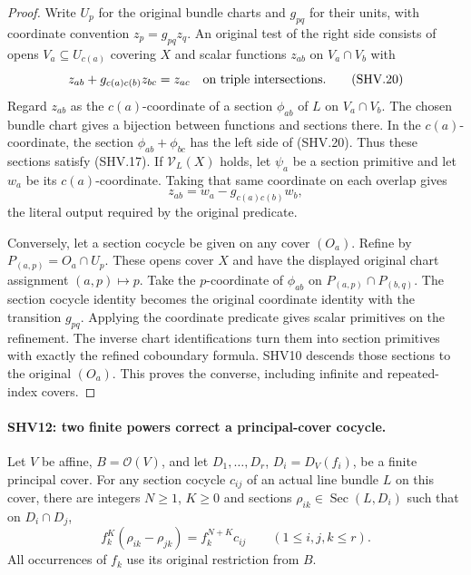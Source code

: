 \documentclass[11pt,a4paper]{article}
\numberwithin{equation}{section}
\theoremstyle{remark}\newtheorem{remark}[theorem]{Remark}
\begin{document}
\begin{proof}
Write $U_p$ for the original bundle charts and $g_{pq}$ for
their units, with coordinate convention $z_p=g_{pq}z_q$.
An original test of the right side consists of opens
$V_a\subseteq U_{c(a)}$ covering $X$ and scalar functions
$z_{ab}$ on $V_a\cap V_b$ with
\[
 z_{ab}+g_{c(a)c(b)}z_{bc}=z_{ac}
                    \quad\hbox{on triple intersections}.
                                                        \tag{SHV.20}
\]
Regard $z_{ab}$ as the $c(a)$-coordinate of a section
$\phi_{ab}$ of $L$ on $V_a\cap V_b$.  The chosen bundle
chart gives a bijection between functions and sections there.
In the $c(a)$-coordinate, the section
$\phi_{ab}+\phi_{bc}$ has the left side of (SHV.20).
Thus these sections satisfy (SHV.17).
If $\mathcal V_L(X)$ holds, let $\psi_a$ be a section primitive
and let $w_a$ be its $c(a)$-coordinate.  Taking that same
coordinate on each overlap gives
\[
             z_{ab}=w_a-g_{c(a)c(b)}w_b,
                                                        \tag{SHV.21}
\]
the literal output required by the original predicate.

Conversely, let a section cocycle be given on any cover $(O_a)$.
Refine by $P_{(a,p)}=O_a\cap U_p$.  These opens cover $X$
and have the displayed original chart assignment $(a,p)\mapsto p$.
Take the $p$-coordinate of $\phi_{ab}$ on
$P_{(a,p)}\cap P_{(b,q)}$.  The section cocycle identity becomes
the original coordinate identity with the transition $g_{pq}$.
Applying the coordinate predicate gives scalar primitives on the
refinement.  The inverse chart identifications turn them into
section primitives with exactly the refined coboundary formula.
SHV10 descends those sections to the original $(O_a)$.
This proves the converse, including infinite and repeated-index
covers.
\end{proof}

\paragraph{SHV12: two finite powers correct a principal-cover cocycle.}
\label{claim:SHV12}
Let $V$ be affine, $B=\mathcal O(V)$, and let
$D_1,\ldots,D_r$, $D_i=D_V(f_i)$, be a finite principal cover.
For any section cocycle $c_{ij}$ of an actual line bundle $L$
on this cover, there are integers $N\ge1$, $K\ge0$ and sections
$\rho_{ik}\in\operatorname{Sec}(L,D_i)$ such that on
$D_i\cap D_j$,
\[
 f_k^K(\rho_{ik}-\rho_{jk})=f_k^{N+K}c_{ij}
                    \qquad(1\le i,j,k\le r).
                                                        \tag{SHV.22}
\]
All occurrences of $f_k$ use its original restriction from $B$.
\end{document}
